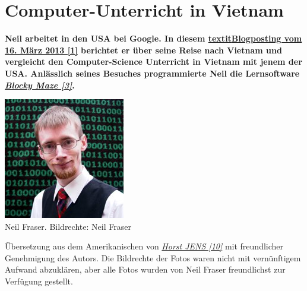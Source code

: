 \section*{Computer-Unterricht in Vietnam}
\hypertarget{vietnam}{}
\label{vietnam}

\textbf{Neil arbeitet in den USA bei Google. In diesem \href{http://neil.fraser.name/news/2013/03/16/}{textit{Blogposting vom 16. M\"arz 2013 [1]}} berichtet er über seine Reise nach Vietnam und vergleicht den Computer-Science Unterricht in Vietnam mit jenem der USA. Anlässlich seines Besuches programmierte Neil die Lernsoftware \href{http://blockly-demo.appspot.com/static/apps/maze/en.html?level=1}{\textit{Blocky Maze [3]}}.} 

\begin{center}
\includegraphics[width=\linewidth]{vietnam/vietnam_neil_fraser.jpg} \\
\footnotesize{Neil Fraser. Bildrechte: Neil Fraser}
\end{center}

Übersetzung aus dem Amerikanischen von \href{http://spielend-programmieren.at}{\textit{Horst JENS [10]}}  mit freundlicher Genehmigung des Autors. Die Bildrechte der Fotos waren nicht mit vernünftigem Aufwand abzuklären, aber alle Fotos wurden von Neil Fraser freundlichst zur Verfügung gestellt. \\

